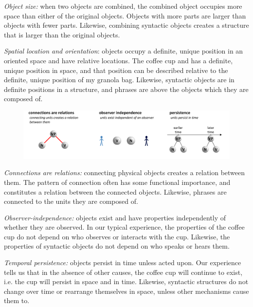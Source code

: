 \textit{Object size:} when two objects are combined, the combined object occupies more space than either of the original objects. Objects with more parts are larger than objects with fewer parts. Likewise, combining syntactic objects creates a structure that is larger than the original objects.

\textit{Spatial location and orientation}: objects occupy a definite, unique position in an oriented space and have relative locations. The coffee cup and has a definite, unique position in space, and that position can be described relative to the definite, unique position of my granola bag. Likewise, syntactic objects are in definite positions in a structure, and phrases are above the objects which they are composed of.

  
\begin{figure}
\includegraphics[width=\textwidth]{figures/Tilsen-img31.png}
\caption{\missingcaption}
\label{fig:}
\end{figure}
 

\textit{Connections are relations:} connecting physical objects creates a relation between them. The pattern of connection often has some functional importance, and constitutes a relation between the connected objects. Likewise, phrases are connected to the units they are composed of.

\textit{Observer-independence:} objects exist and have properties independently of whether they are observed. In our typical experience, the properties of the coffee cup do not depend on who observes or interacts with the cup. Likewise, the properties of syntactic objects do not depend on who speaks or hears them.

\textit{Temporal persistence:} objects persist in time unless acted upon. Our experience tells us that in the absence of other causes, the coffee cup will continue to exist, i.e. the cup will persist in space and in time. Likewise, syntactic structures do not change over time or rearrange themselves in space, unless other mechanisms cause them to.

